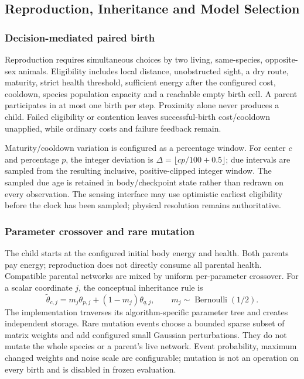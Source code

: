 \subsection{Reproduction, Inheritance and Model Selection}\label{sec:inheritance}
\subsubsection{Decision-mediated paired birth}
Reproduction requires simultaneous  choices by two living,
same-species, opposite-sex animals. Eligibility includes local distance,
unobstructed sight, a dry route, maturity, strict health threshold, sufficient
energy after the configured cost, cooldown, species population capacity and a
reachable empty birth cell. A parent participates in at most one birth per step.
Proximity alone never produces a child. Failed eligibility or contention leaves
successful-birth cost/cooldown unapplied, while ordinary costs and failure
feedback remain.

Maturity/cooldown variation is configured as a percentage window. For center
$c$ and percentage $p$, the integer deviation is
$\Delta=\lfloor cp/100+0.5\rfloor$; due intervals are sampled from the resulting
inclusive, positive-clipped integer window. The sampled due age is retained in
body/checkpoint state rather than redrawn on every observation. The sensing
interface may use optimistic earliest eligibility before the clock has been
sampled; physical resolution remains authoritative.

\subsubsection{Parameter crossover and rare mutation}
The child starts at the configured initial body energy and health. Both parents
pay energy; reproduction does not directly consume all parental health.
Compatible parental networks are mixed by uniform per-parameter crossover.
For a scalar coordinate $j$, the conceptual inheritance rule is
\begin{equation}
 \widetilde\theta_{c,j}=m_j\theta_{p,j}+(1-m_j)\theta_{q,j},
 \qquad m_j\sim\operatorname{Bernoulli}(1/2).
\end{equation}
The implementation traverses its algorithm-specific parameter tree and creates
independent storage. Rare mutation events choose a bounded sparse subset of
matrix weights and add configured small Gaussian perturbations. They do not
mutate the whole species or a parent's live network. Event probability, maximum
changed weights and noise scale are configurable; mutation is not an operation
on every birth and is disabled in frozen evaluation.

